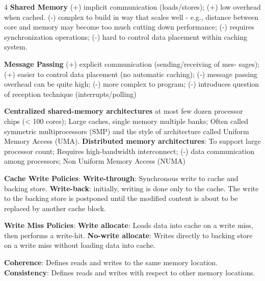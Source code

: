 \documentclass[a4paper,landscape]{article}
\begin{document}
\begin{multicols}{4}
\noindent \textbf{Shared Memory} (+) implicit communication (loads/stores); (+) low overhead when cached. (-) complex to build in way that scales well - e.g., distance between core and memory may become too much cutting down performance; (-) requires synchronization operations; (-) hard to control data placement within caching system.

\noindent \textbf{Message Passing} (+) explicit communication (sending/receiving of mes- sages); (+) easier to control data placement (no automatic caching); (-) message passing overhead can be quite high; (-) more complex to program; (-) introduces question of reception technique (interrupts/polling)

\noindent \textbf{Centralized shared-memory architectures} at most few dozen processor chips (< 100 cores); Large caches, single memory multiple banks; Often called symmetric multiprocessors (SMP) and the style of architecture called Uniform Memory Access (UMA). \textbf{Distributed memory architectures}: To support large processor count; Requires high-bandwidth interconnect; (-) data communication among processors; Non Uniform Memory Access (NUMA)



\noindent \textbf{Cache Write Policies}: \textbf{Write-through}: Synchronous write to cache and backing store. \textbf{Write-back}: initially, writing is done only to the cache. The write to the backing store is postponed until the modified content is about to be replaced by another cache block.

\noindent \textbf{Write Miss Policies}: \textbf{Write allocate}: Loads data into cache on a write miss, then performs a write-hit. \textbf{No-write allocate}: Writes directly to backing store on a write miss without loading data into cache.

\noindent \textbf{Coherence}: Defines reads and writes to the same memory location. \textbf{Consistency}: Defines reads and writes with respect to other memory locations.








\end{multicols}
\end{document}
